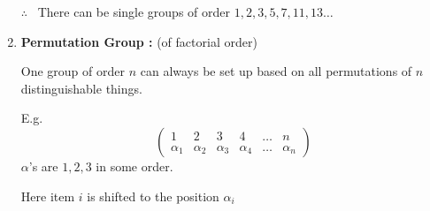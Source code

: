 \begin{enumerate}
$\therefore$ \ There can be single groups of order $1,2,3,5,7,11,13\ldots$

\item {\bf Permutation Group :} (of factorial order)

One group of order $n$ can always be set up based on all permutations of $n$ distinguishable things.

E.g.
$$
\left(
\begin{matrix}
1 & 2 & 3 & 4 & \ldots & n\\
\alpha_{1} & \alpha_{2} & \alpha_{3} & \alpha_{4} & \ldots & \alpha_{n}
\end{matrix}
\right)
$$
$\alpha$'s are $1,2,3$ in some order.

Here item $i$ is shifted to the position $\alpha_{i}$
\end{enumerate}

